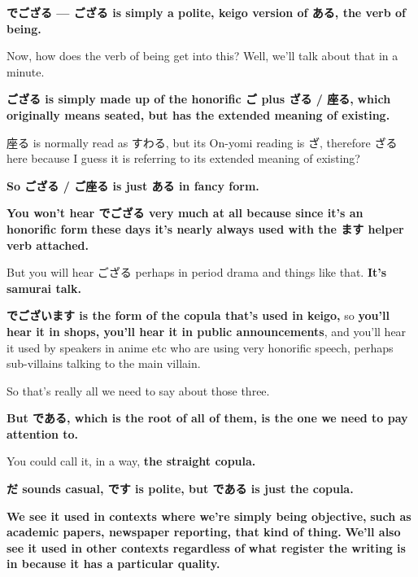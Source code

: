 \stopsectionlevel

\startsectionlevel[title={でござる},reference={でござる}]

{\bf でござる --- ござる is simply a polite, keigo version of ある, the verb of being.}

Now, how does the verb of being get into this? Well, we'll talk about that in a minute.

{\bf ござる is simply made up of the honorific ご plus ざる / 座る,} {\bf which originally means seated, but has the extended meaning of existing.}

座る is normally read as すわる, but its On-yomi reading is ざ, therefore ざる here because I guess it is referring to its extended meaning of existing?

{\bf So ござる / ご座る is just ある in fancy form.}

{}

{\bf You won't hear でござる very much at all because since it's an honorific form} {\bf these days it's nearly always used with the ます helper verb attached.}

But you will hear ござる perhaps in period drama and things like that. {\bf It's samurai talk.}

\stopsectionlevel

\startsectionlevel[title={でございます},reference={でございます}]

{\bf でございます is the form of the copula that's used in keigo,} so {\bf you'll hear it in shops, you'll hear it in public announcements}, and you'll hear it used by speakers in anime etc who are using very honorific speech, perhaps sub-villains talking to the main villain.

{}

So that's really all we need to say about those three.

\stopsectionlevel

\startsectionlevel[title={である},reference={である}]

{\bf But である, which is the root of all of them, is the one we need to pay attention to.}

You could call it, in a way, {\bf the straight copula.}

{\bf だ sounds casual, です is polite, but である is just the copula.}

{}

{\bf We see it used in contexts where we're simply being objective,} {\bf such as academic papers, newspaper reporting, that kind of thing.} {\bf We'll also see it used in other contexts regardless of} {\bf what register the writing is in because it has a particular quality.}

